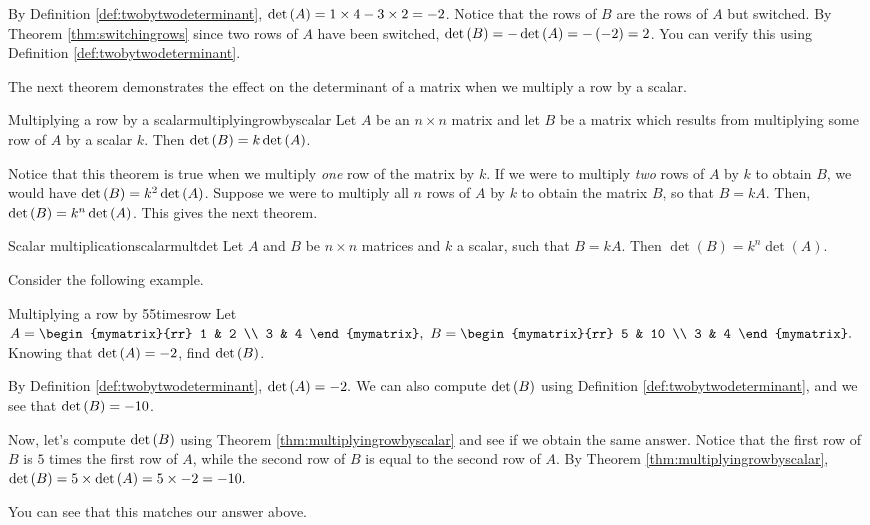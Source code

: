 \begin{solution}
By Definition \ref{def:twobytwodeterminant}, 
$\det \left(A\right) = 1 \times 4 - 3 \times 2 = -2$. 
Notice that the rows of $B$ are the rows of $A$ but switched. 
By Theorem \ref{thm:switchingrows} since two rows of $A$ have been switched,
$\det \left(B\right) = - \det \left(A\right) = - \left(-2\right) = 2$.
You can verify this using Definition \ref{def:twobytwodeterminant}. 
\end{solution}

The next theorem demonstrates the effect on the determinant of a matrix when we multiply
a row by a scalar.

\begin{theorem}{Multiplying a row by a scalar}{multiplyingrowbyscalar}
Let $A$ be an $n\times n$ matrix and let $B$ be a matrix
which results from multiplying some row of $A$ by a scalar $k$. Then $\det
\left(B\right) = k \det \left(A\right) $.
\end{theorem}

Notice that this theorem is true when we multiply {\em one\em} row of the matrix by $k$.
If we were to multiply {\em two\em} rows of $A$ by $k$ to obtain $B$, we would have
$\det \left(B\right) = k^2 \det \left(A\right)$.
Suppose we were to multiply all $n$ rows of $A$ by $k$ to obtain the matrix $B$, so that 
$B = kA$. Then, $\det \left(B\right) = k^n \det \left(A\right)$. This gives the next theorem.

\begin{theorem}{Scalar multiplication}{scalarmultdet}
Let $A$ and $B$ be $n \times n$ matrices and $k$ a scalar, such that $B = kA$. Then $\det(B) = k^n \det(A)$.
\end{theorem}

Consider the following example.

\begin{example}{Multiplying a row by 5}{5timesrow}
Let $A=\begin{mymatrix}{rr}
1 & 2 \\
3 & 4
\end{mymatrix} ,\ B=\begin{mymatrix}{rr}
5 & 10 \\
3 & 4
\end{mymatrix} .$ 
Knowing that $\det \left(A \right) =-2$, find  $\det \left(B \right) $.
\end{example}

\begin{solution} 
By Definition \ref{def:twobytwodeterminant}, $\det \left(A\right) =-2.$ We can also compute
$\det \left(B\right)$ using Definition \ref{def:twobytwodeterminant}, and we see that $\det \left(B\right) = -10$. 

Now, let's compute  $\det \left(B\right)$ using Theorem \ref{thm:multiplyingrowbyscalar} and see if we
obtain the same answer. Notice that the first row of $B$ is $5$ times the first row of $A$, while the
second row of $B$ is equal to the second row of $A$. 
By Theorem \ref{thm:multiplyingrowbyscalar}, 
$\det  \left(B \right) = 5 \times \det \left(A \right) = 5 \times -2 = -10.$

You can see that this matches our answer above.
\end{solution}

